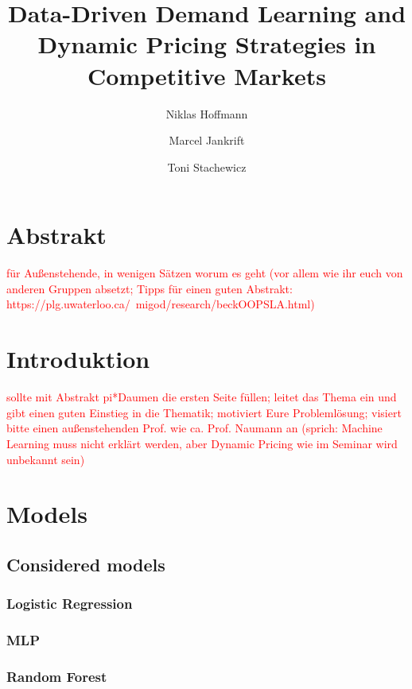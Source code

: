 \documentclass[sigconf]{acmart}
\begin{document}
\title{Data-Driven Demand Learning and Dynamic Pricing Strategies in Competitive Markets} 

\author{Niklas Hoffmann}
\author{Marcel Jankrift} 
\author{Toni Stachewicz}


\maketitle

\section{Abstrakt} \textcolor{red}{für Außenstehende, in wenigen Sätzen worum es geht (vor allem wie ihr euch von anderen Gruppen absetzt; Tipps für einen guten Abstrakt: https://plg.uwaterloo.ca/~migod/research/beckOOPSLA.html)}

\section{Introduktion} \textcolor{red}{sollte mit Abstrakt pi*Daumen die ersten Seite füllen; leitet das Thema ein und gibt einen guten Einstieg in die Thematik; motiviert Eure Problemlösung; visiert bitte einen außenstehenden Prof. wie ca. Prof. Naumann an (sprich: Machine Learning muss nicht erklärt werden, aber Dynamic Pricing wie im Seminar wird unbekannt sein)}

\section{Models}
\subsection{Considered models}
\subsubsection{Logistic Regression}
\subsubsection{MLP}
\subsubsection{Random Forest}
\end{document}

